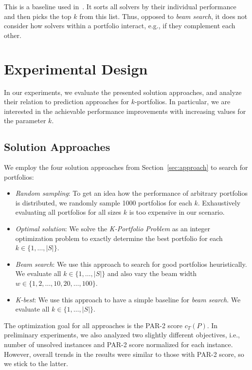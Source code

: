 \documentclass[conference]{IEEEtran}
\begin{document}
This is a baseline used in~\cite{nof2020real}.
It sorts all solvers by their individual performance and then picks the top $k$ from this list.
Thus, opposed to \emph{beam search}, it does not consider how solvers within a portfolio interact, e.g., if they complement each other.

\section{Experimental Design}
\label{sec:experimental-design}

In our experiments, we evaluate the presented solution approaches, and analyze their relation to prediction approaches for $k$-portfolios. 
In particular, we are interested in the achievable performance improvements with increasing values for the parameter $k$. 

\subsection{Solution Approaches}

We employ the four solution approaches from Section~\ref{sec:approach} to search for portfolios:

\begin{itemize}
	\item \emph{Random sampling}:
	To get an idea how the performance of arbitrary portfolios is distributed, we randomly sample 1000 portfolios for each $k$.
	Exhaustively evaluating all portfolios for all sizes $k$ is too expensive in our scenario.
	\item \emph{Optimal solution}:
	We solve the \emph{K-Portfolio Problem} as an integer optimization problem to exactly determine the best portfolio for each $k \in \{1, \dots, |S|\}$.
	\item \emph{Beam search}: 
	We use this approach to search for good portfolios heuristically.
	We evaluate all $k \in \{1, \dots, |S|\}$ and also vary the beam width $w \in \{1, 2, \dots, 10, 20, \dots, 100\}$.
	\item \emph{K-best}:
	We use this approach to have a simple baseline for \emph{beam search}.
	We evaluate all $k \in \{1, \dots, |S|\}$.
\end{itemize}

The optimization goal for all approaches is the PAR-2 score $c_T(P)$.
In preliminary experiments, we also analyzed two slightly different objectives, i.e., number of unsolved instances and PAR-2 score normalized for each instance.
However, overall trends in the results were similar to those with PAR-2 score, so we stick to the latter.
\end{document}
